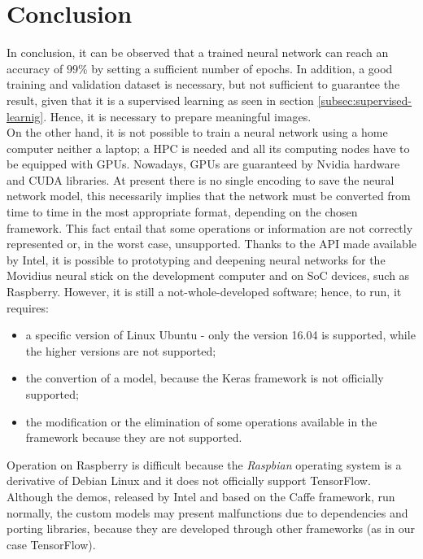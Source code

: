 \section{Conclusion}
\label{sec:conclusion}
In conclusion, it can be observed that a trained neural network can reach an 
accuracy of $99\%$ by setting a sufficient number of epochs. In addition, a 
good training and validation dataset is necessary, but not sufficient to 
guarantee the result, given that it is a supervised learning as seen in 
section \ref{subsec:supervised-learnig}.
Hence, it is necessary to prepare meaningful images.\\
On the other hand, it is not possible to train a neural network using a home 
computer neither a laptop; a HPC is needed and all its computing nodes have to be
equipped with GPUs. 
Nowadays, GPUs are guaranteed by Nvidia hardware and CUDA libraries.
At present there is no single encoding to save the neural network model, this 
necessarily implies that the network must be converted from time to time in 
the most appropriate format, depending on the chosen framework.
This fact entail that some operations or information are not correctly 
represented or, in the worst case, unsupported.
Thanks to the API made available by Intel, it is possible to  
prototyping and deepening neural networks for the Movidius neural stick on the 
 development computer and on SoC devices, such as Raspberry.
However, it is still a  not-whole-developed software; hence, to run, it requires:
\begin{itemize}
\item a specific version of Linux Ubuntu - only the version 16.04 is 
supported, while the higher versions are not supported;
\item the convertion of a model, because the Keras framework is not officially supported;
\item the modification or the elimination of some operations available in the 
framework because they are not supported.
\end{itemize}
Operation on Raspberry is difficult because the \emph{Raspbian} operating system
is a derivative of Debian Linux and it does not officially support TensorFlow.
Although the demos, released by Intel and based on the Caffe framework, run 
normally, the custom models may present malfunctions due to dependencies and 
porting libraries, because they are developed through other frameworks (as in 
our case TensorFlow).
